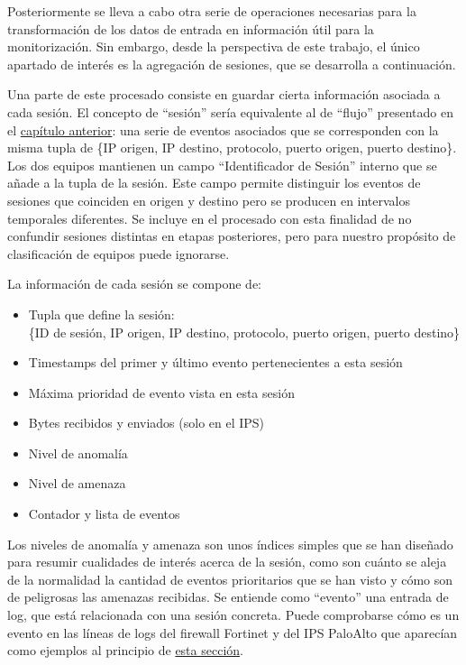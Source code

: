 Posteriormente se lleva a cabo otra serie de operaciones necesarias para la transformación de los datos de entrada en información útil para la monitorización.
Sin embargo, desde la perspectiva de este trabajo, el único apartado de interés es la agregación de sesiones, que se desarrolla a continuación.

Una parte de este procesado consiste en guardar cierta información asociada a cada sesión.
El concepto de ``sesión'' sería equivalente al de ``flujo'' presentado en el \hyperref[chap:estadodelarte]{capítulo anterior}:
una serie de eventos asociados que se corresponden con la misma tupla de \{IP origen, IP destino, protocolo, puerto origen, puerto destino\}.
Los dos equipos mantienen un campo ``Identificador de Sesión'' interno que se añade a la tupla de la sesión.
Este campo permite distinguir los eventos de sesiones que coinciden en origen y destino pero se producen en intervalos temporales diferentes.
Se incluye en el procesado con esta finalidad de no confundir sesiones distintas en etapas posteriores, pero para nuestro propósito de clasificación de equipos puede ignorarse.

La información de cada sesión se compone de:
\begin{itemize}
    \item Tupla que define la sesión:\\\{ID de sesión, IP origen, IP destino, protocolo, puerto origen, puerto destino\}
    \item Timestamps del primer y último evento pertenecientes a esta sesión
    \item Máxima prioridad de evento vista en esta sesión
    \item Bytes recibidos y enviados (solo en el IPS)
    \item Nivel de anomalía
    \item Nivel de amenaza
    \item Contador y lista de eventos
\end{itemize}

Los niveles de anomalía y amenaza son unos índices simples que se han diseñado para resumir cualidades de interés acerca de la sesión, como son
cuánto se aleja de la normalidad la cantidad de eventos prioritarios que se han visto y cómo son de peligrosas las amenazas recibidas.
Se entiende como ``evento'' una entrada de log, que está relacionada con una sesión concreta.
Puede comprobarse cómo es un evento en las líneas de logs del firewall Fortinet y del IPS PaloAlto que aparecían como ejemplos al principio de \hyperref[sec:extraccionyfiltrado]{esta sección}.

